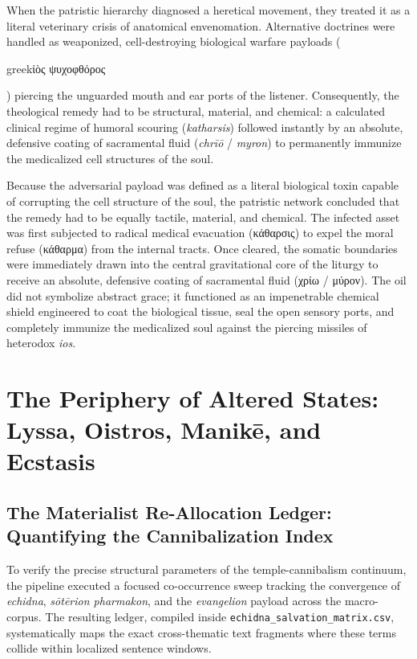 \documentclass[11pt,twoside,a4paper]{article}
\begin{document}
When the patristic hierarchy diagnosed a heretical movement, they treated it as a literal 
veterinary crisis of anatomical envenomation. Alternative doctrines were handled as weaponized, 
cell-destroying biological warfare payloads (\begin{foreignlanguage}{greek}ἰὸς ψυχοφθόρος\end{foreignlanguage}) 
piercing the unguarded mouth and ear ports of the listener. Consequently, the theological remedy 
had to be structural, material, and chemical: a calculated clinical regime of humoral scouring 
(\textit{katharsis}) followed instantly by an absolute, defensive coating of sacramental fluid 
(\textit{chrīō} / \textit{myron}) to permanently immunize the medicalized cell structures of the soul.

Because the adversarial payload was defined as a literal biological toxin capable of corrupting the cell structure of the soul, the patristic network concluded that the remedy had to be equally tactile, material, and chemical. The infected asset was first subjected to radical medical evacuation (\textgreek{κάθαρσις}) to expel the moral refuse (\textgreek{κάθαρμα}) from the internal tracts.
Once cleared, the somatic boundaries were immediately drawn into the central gravitational core of the liturgy to receive an absolute, defensive coating of sacramental fluid (\textgreek{χρίω / μύρον}). The oil did not symbolize abstract grace; it functioned as an impenetrable chemical shield engineered to coat the biological tissue, seal the open sensory ports, and completely immunize the medicalized soul against the piercing missiles of heterodox \textit{ios}.

\section{The Periphery of Altered States: Lyssa, Oistros, Manikē, and Ecstasis}

\subsection{The Materialist Re-Allocation Ledger: Quantifying the Cannibalization Index}
To verify the precise structural parameters of the temple-cannibalism continuum, the pipeline executed a focused co-occurrence sweep tracking the convergence of \textit{echidna}, \textit{sōtērion pharmakon}, and the \textit{evangelion} payload across the macro-corpus. The resulting ledger, compiled inside \texttt{echidna\_salvation\_matrix.csv}, systematically maps the exact cross-thematic text fragments where these terms collide within localized sentence windows. 
\end{document}
